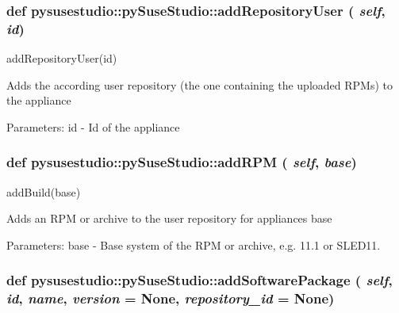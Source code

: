  \hypertarget{classpysusestudio_1_1py_suse_studio_a310e27602fda6a8c78bbc583ab882d76}{
\subsubsection[{addRepositoryUser}]{\setlength{\rightskip}{0pt plus 5cm}def pysusestudio::pySuseStudio::addRepositoryUser ( {\em self}, \/   {\em id})}}
\label{classpysusestudio_1_1py_suse_studio_a310e27602fda6a8c78bbc583ab882d76}
\begin{DoxyVerb}addRepositoryUser(id)

            Adds the according user repository (the one containing the uploaded RPMs) to the appliance
            
            Parameters:
id - Id of the appliance

\end{DoxyVerb}
 \hypertarget{classpysusestudio_1_1py_suse_studio_aa0a1478f603ec4913db98d7de866e7f7}{
\subsubsection[{addRPM}]{\setlength{\rightskip}{0pt plus 5cm}def pysusestudio::pySuseStudio::addRPM ( {\em self}, \/   {\em base})}}
\label{classpysusestudio_1_1py_suse_studio_aa0a1478f603ec4913db98d7de866e7f7}
\begin{DoxyVerb}addBuild(base)

            Adds an RPM or archive to the user repository for appliances base 
            
            Parameters:
base - Base system of the RPM or archive, e.g. 11.1 or SLED11.


\end{DoxyVerb}
 \hypertarget{classpysusestudio_1_1py_suse_studio_aff587b16668414a1f2e393bf0aab6943}{
\subsubsection[{addSoftwarePackage}]{\setlength{\rightskip}{0pt plus 5cm}def pysusestudio::pySuseStudio::addSoftwarePackage ( {\em self}, \/   {\em id}, \/   {\em name}, \/   {\em version} = {\ttfamily None}, \/   {\em repository\_\-id} = {\ttfamily None})}}

